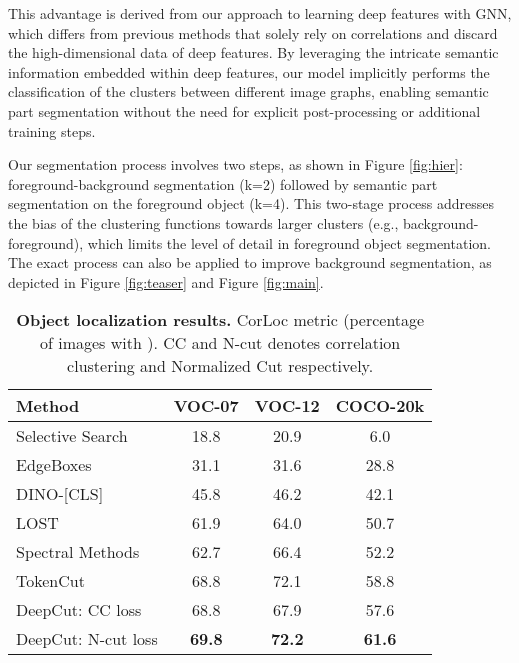 \documentclass[10pt,twocolumn,letterpaper]{article}
\begin{document}
This advantage is derived from our approach to learning deep features with GNN, which differs from previous methods \cite{bianchi2020spectral, wang2022self} that solely rely on correlations and discard the high-dimensional data of deep features. By leveraging the intricate semantic information embedded within deep features, our model implicitly performs the classification of the clusters between different image graphs, enabling semantic part segmentation without the need for explicit post-processing or additional training steps.

Our segmentation process involves two steps, as shown in Figure \ref{fig:hier}: foreground-background segmentation (k=2) followed by semantic part segmentation on the foreground object (k=4). This two-stage process addresses the bias of the clustering functions towards larger clusters (e.g., background-foreground), which limits the level of detail in foreground object segmentation. The exact process can also be applied to improve background segmentation, as depicted in Figure \ref{fig:teaser} and Figure \ref{fig:main}.



\begin{table}
  \centering
  \begin{tabular}{@{}lc c c@{}}
    \toprule
    Method & VOC-07 & VOC-12 &COCO-20k\\
    \midrule
    Selective Search\cite{uijlings2013selective} & 18.8 & 20.9 & 6.0 \\
    EdgeBoxes\cite{zitnick2014edge} & 31.1 & 31.6 & 28.8 \\
    DINO-[CLS]\cite{caron2021emerging} & 45.8 & 46.2 & 42.1 \\
    LOST\cite{simeoni2021localizing} & 61.9 & 64.0 &  50.7\\
    Spectral Methods\cite{melas2022deep} & 62.7 & 66.4 &  52.2\\
    TokenCut\cite{wang2022self} & 68.8 & 72.1 &  58.8\\
    \midrule
    DeepCut:  CC loss&68.8 & 67.9 & 57.6\\
    DeepCut:  N-cut loss&\textbf{69.8} & \textbf{72.2} & \textbf{61.6}\\
    \bottomrule
  \end{tabular}
  \caption{\textbf{Object localization results.} CorLoc metric (percentage of images with ). 
  CC and N-cut denotes correlation clustering and Normalized Cut respectively.}
  \label{tab:obdet}
\end{table}
 
\end{document}
